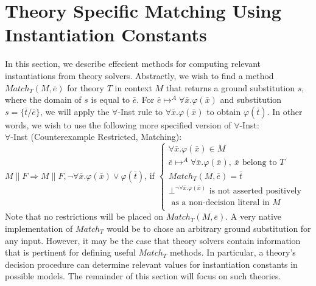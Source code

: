 \documentclass{llncs}
\begin{document}
\section{Theory Specific Matching Using Instantiation Constants}
\label{sec:theory-matching}

In this section, we describe effecient methods for computing relevant instantiations from theory solvers.
Abstractly, we wish to find a method $Match_T( M, \bar{ e } )$ for theory $T$ in context $M$ that returns a ground substitution $s$, where the domain of $s$ is equal to $\bar{ e }$.
For $\bar{ e } \mapsto^A \forall \bar{x}. \varphi( \bar{x} )$ and substitution $s = \{ \bar{t}/\bar{e} \}$, we will apply the $\forall$-Inst rule to $\forall \bar{x}. \varphi( \bar{x} )$ to obtain $\varphi( \bar{t} )$.
In other words, we wish to use the following more specified version of $\forall$-Inst: \\

\noindent $\forall$-Inst (Counterexample Restricted, Matching): \\

$M \parallel F \Longrightarrow M \parallel F, \neg \forall \bar{x}. \varphi( \bar{ x } ) \vee \varphi( \bar{ t } )$, if   
$\begin{cases}
  \forall \bar{x}. \varphi( \bar{ x } ) \in M \\
  \bar{ e } \mapsto^A \forall \bar{x}. \varphi( \bar{ x } ), \ \bar{ x } \text{ belong to $T$ } \\
  Match_T( M, \bar{ e } ) = \bar{ t } \\
  \bot^{\neg \forall \bar{x}. \varphi( \bar{ x } )} \text{ is not asserted positively }\\
  \text{ \ \ \ as a non-decision literal in $M$ } \\
\end{cases}$ \\

Note that no restrictions will be placed on $Match_T( M, \bar{ e } )$. 
A very native implementation of $Match_T$ would be to chose an arbitrary ground substitution for any input.
However, it may be the case that theory solvers contain information that is pertinent for defining useful $Match_T$ methods.
In particular, a theory's decision procedure can determine relevant values for instantiation constants in possible models.
The remainder of this section will focus on such theories.

\end{document}
